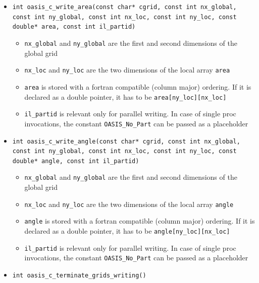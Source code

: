 \begin{itemize}
\vspace{0.2cm}
\item {\tt int oasis\_c\_write\_area(const char* cgrid, const int nx\_global, const int ny\_global, const int nx\_loc, const int ny\_loc, const double* area, const int il\_partid)}
  \begin{itemize}
    \item {\tt nx\_global} and {\tt ny\_global} are the first and second dimensions
      of the global grid
    \item {\tt nx\_loc} and {\tt ny\_loc} are the two dimensions
      of the local array {\tt area}
    \item {\tt area} is stored with a fortran compatible
      (column major) ordering. If it is  declared as a double
      pointer, it has to be {\tt area[ny\_loc][nx\_loc]}
    \item {\tt il\_partid} is relevant only for parallel writing. In case
      of single proc invocations, the constant {\tt OASIS\_No\_Part}
      can be passed as a placeholder
  \end{itemize}

\vspace{0.2cm}
\item {\tt int oasis\_c\_write\_angle(const char* cgrid, const int nx\_global, const int ny\_global, const int nx\_loc, const int ny\_loc, const double* angle, const int il\_partid)}
  \begin{itemize}
    \item {\tt nx\_global} and {\tt ny\_global} are the first and second dimensions
      of the global grid
    \item {\tt nx\_loc} and {\tt ny\_loc} are the two dimensions
      of the local array {\tt angle}
    \item {\tt angle} is stored with a fortran compatible
      (column major) ordering. If it is  declared as a double
      pointer, it has to be {\tt angle[ny\_loc][nx\_loc]}
    \item {\tt il\_partid} is relevant only for parallel writing. In case
      of single proc invocations, the constant {\tt OASIS\_No\_Part}
      can be passed as a placeholder
  \end{itemize}

\vspace{0.2cm}
\item {\tt int oasis\_c\_terminate\_grids\_writing()}


\end{itemize}
